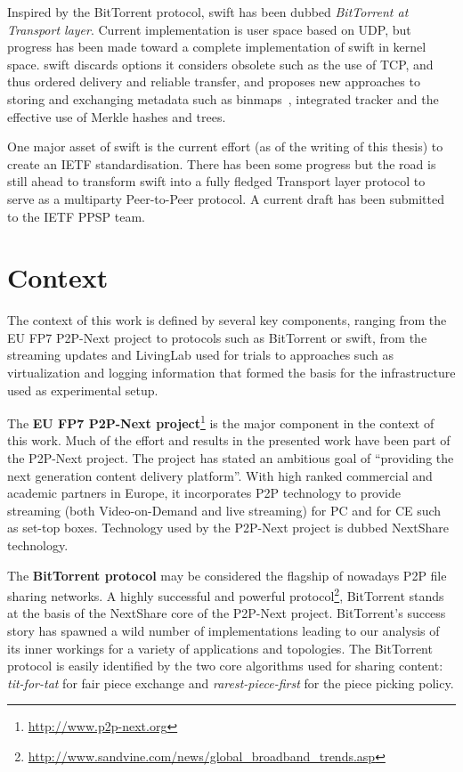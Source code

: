 Inspired by the BitTorrent protocol, swift has been dubbed \textit{BitTorrent
at Transport layer}. Current implementation is user space based on UDP, but
progress has been made toward a complete implementation of swift in kernel
space. swift discards options it considers obsolete such as the use of TCP,
and thus ordered delivery and reliable transfer, and proposes new approaches
to storing and exchanging metadata such as binmaps~\cite{binmaps}, integrated
tracker and the effective use of Merkle hashes and trees.

One major asset of swift is the current effort (as of the writing of this
thesis) to create an IETF standardisation. There has been some progress but
the road is still ahead to transform swift into a fully fledged
Transport layer protocol to serve as a multiparty Peer-to-Peer protocol. A
current draft has been submitted to the IETF PPSP team.

\section{Context}
\label{sec:intro:context}

The context of this work is defined by several key components, ranging from
the EU FP7 P2P-Next project to protocols such as BitTorrent or swift, from
the streaming updates and LivingLab used for trials to approaches such as
virtualization and logging information that formed the basis for the
infrastructure used as experimental setup.

The \textbf{EU FP7 P2P-Next project}\footnote{\url{http://www.p2p-next.org}} is the
major component in the context of this work. Much of the effort and results in
the presented work have been part of the P2P-Next project. The project has
stated an ambitious goal of ``providing the next generation content delivery
platform''. With high ranked commercial and academic partners in Europe, it
incorporates P2P technology to provide streaming (both Video-on-Demand and
live streaming) for PC and for CE such as set-top boxes. Technology used by
the P2P-Next project is dubbed NextShare technology.

The \textbf{BitTorrent protocol} may be considered the flagship of nowadays
P2P file sharing networks. A highly successful and powerful
protocol\footnote{\url{http://www.sandvine.com/news/global\_broadband\_trends.asp}},
BitTorrent stands at the basis of the NextShare core of the P2P-Next project.
BitTorrent's success story has spawned a wild number of implementations
leading to our analysis of its inner workings for a variety of applications and
topologies. The BitTorrent protocol is easily identified by the two core
algorithms used for sharing content: \textit{tit-for-tat} for fair piece
exchange and \textit{rarest-piece-first} for the piece picking policy.


